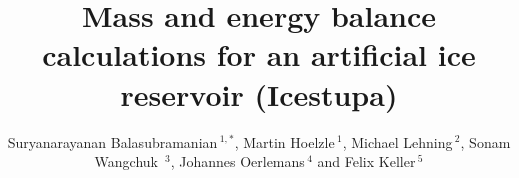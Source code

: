 \documentclass[utf8]{frontiersSCNS} %
\def\keyFont{\fontsize{8}{11}\helveticabold }
\def\firstAuthorLast{Balasubramanian {et~al.}} %
\def\Authors{Suryanarayanan Balasubramanian\,$^{1,*}$, Martin Hoelzle\,$^{1}$, Michael Lehning\,$^{2}$, Sonam Wangchuk \,$^{3}$, Johannes Oerlemans\,$^{4}$ and Felix Keller\,$^{5}$}
\begin{document}
\onecolumn
{}

\title[Artificial Ice Reservoirs]{Mass and energy balance calculations for an artificial ice reservoir (Icestupa)}

\author[\firstAuthorLast ]{\Authors}
\address{}
\correspondance{}

\extraAuth{}

\maketitle


% 
% 
\end{document}

